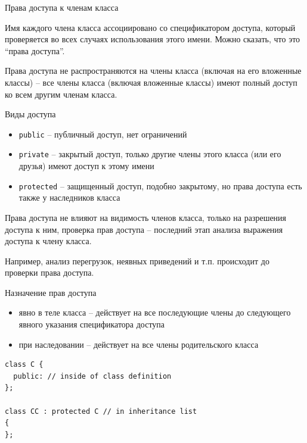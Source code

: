 \documentclass[unknownkeysallowed,xcolor=table]{beamer}
\begin{document}
\begin{frame}{Права доступа к членам класса}

Имя каждого члена класса ассоциировано со спецификатором доступа, который проверяется во всех случаях использования этого имени. Можно сказать, что это ``права доступа''.

\vspace{2em}

Права доступа не распространяются на члены класса (включая на его вложенные классы) -- все члены класса (включая вложенные классы) имеют полный доступ ко всем другим членам класса.

\end{frame}

\begin{frame}{Виды доступа}

\begin{itemize}
  \item \lstinline{public} -- публичный доступ, нет ограничений \vspace{0.5em}
  \item \lstinline{private} -- закрытый доступ, только другие члены этого класса (или его друзья) имеют доступ к этому имени \vspace{0.5em}
  \item \lstinline{protected} -- защищенный доступ, подобно закрытому, но права доступа есть также у наследников класса
\end{itemize}

\vspace{1em}

Права доступа не влияют на видимость членов класса, только на разрешения доступа к ним, проверка прав доступа -- последний этап анализа выражения доступа к члену класса.

Например, анализ перегрузок, неявных приведений и т.п. происходит до проверки права доступа.

\end{frame}

\begin{frame}[fragile]{Назначение прав доступа}

\begin{itemize}
  \item явно в теле класса -- действует на все последующие члены до следующего явного указания спецификатора доступа \vspace{1em}
  \item при наследовании -- действует на все члены родительского класса
\end{itemize}

\begin{lstlisting}
class C {
  public: // inside of class definition
};

class CC : protected C // in inheritance list
{
};
\end{lstlisting}

\end{frame}
\end{document}
